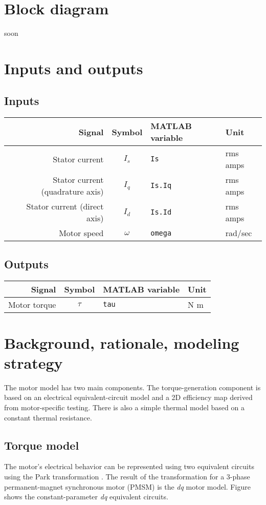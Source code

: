 \documentclass[../SimBALink.tex]{subfiles}
\begin{document}
\section{Block diagram}
soon

\section{Inputs and outputs}
	\subsection{Inputs}
	\begin{tabular}{ r | c | l | l }
		Signal						&	Symbol				&	MATLAB variable	&	Unit						\\\hline	
		Stator current					&	$I_s$				&	\texttt{Is}			&	rms amps					\\
		Stator current (quadrature axis)	&	$I_q$				&	\texttt{Is.Iq}		&	rms amps			\\
		Stator current (direct axis)		&	$I_d$				&	\texttt{Is.Id}		&	rms amps			\\
		Motor speed					&	$\omega$			&	\texttt{omega}		&	rad/sec
	\end{tabular}
	
	\subsection{Outputs}
	\begin{tabular}{ r | c | l | l }
		Signal						&	Symbol				&	MATLAB variable	&	Unit						\\\hline	
		Motor torque					&	$\tau$				&	\texttt{tau}		&	N m				\\
	\end{tabular}
	
\section{Background, rationale, modeling strategy}
	The motor model has two main components. The torque-generation component is based on an electrical equivalent-circuit model and a 2D efficiency map derived from motor-specific testing. There is also a simple thermal model based on a constant thermal resistance.
	
	\subsection{Torque model}
		The motor's electrical behavior can be represented using two equivalent circuits using the Park transformation \cite{Park1929}. The result of the transformation for a 3-phase permanent-magnet synchronous motor (PMSM) is the \textit{dq} motor model. Figure  shows the constant-parameter \textit{dq} equivalent circuits.
		
\end{document}
